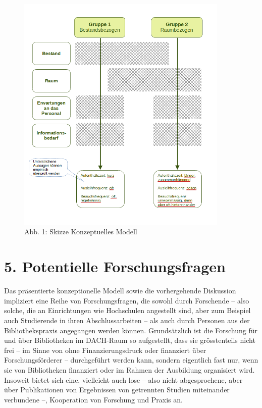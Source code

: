 \documentclass[a4paper,
fontsize=11pt,
oneside,
numbers=noperiodatend,
parskip=half-,
bibliography=totoc,
final
]{scrartcl}
\begin{document}
\begin{figure}
\centering
\includegraphics[width=0.9\textwidth]{img/Skizze_Modell.png}
\caption{Abb. 1: Skizze Konzeptuelles Modell}
\end{figure}

\hypertarget{potentielle-forschungsfragen}{%
\section{5. Potentielle
Forschungsfragen}\label{potentielle-forschungsfragen}}

Das präsentierte konzeptionelle Modell sowie die vorhergehende
Diskussion impliziert eine Reihe von Forschungsfragen, die sowohl durch
Forschende -- also solche, die an Einrichtungen wie Hochschulen
angestellt sind, aber zum Beispiel auch Studierende in ihren
Abschlussarbeiten -- als auch durch Personen aus der Bibliothekspraxis
angegangen werden können. Grundsätzlich ist die Forschung für und über
Bibliotheken im DACH-Raum so aufgestellt, dass sie grösstenteils nicht
frei -- im Sinne von ohne Finanzierungsdruck oder finanziert über
Forschungsförderer -- durchgeführt werden kann, sondern eigentlich fast
nur, wenn sie von Bibliotheken finanziert oder im Rahmen der Ausbildung
organisiert wird. Insoweit bietet sich eine, vielleicht auch lose --
also nicht abgesprochene, aber über Publikationen von Ergebnissen von
getrennten Studien miteinander verbundene --, Kooperation von Forschung
und Praxis an.
\end{document}

